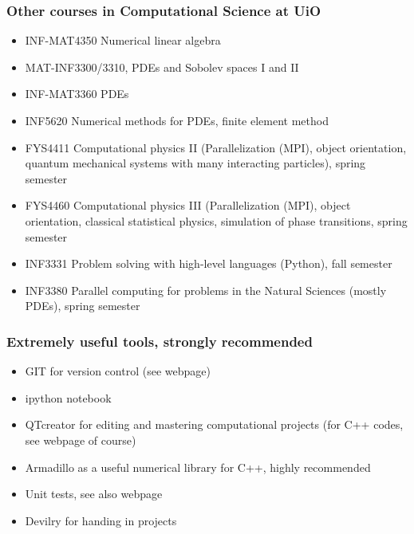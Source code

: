 \documentclass{beamer}
\newenvironment{block_mdfboxadmon}[1][]{\begin{block}{#1}}{\end{block}}
\begin{document}
\begin{frame}
\frametitle{Other courses in Computational Science at UiO}

\begin{block_mdfboxadmon}
\begin{itemize}
  \item INF-MAT4350 Numerical linear algebra

  \item MAT-INF3300/3310, PDEs and Sobolev spaces I and II

  \item INF-MAT3360 PDEs

  \item INF5620 Numerical methods for PDEs, finite element method

  \item FYS4411 Computational physics II (Parallelization (MPI), object orientation, quantum mechanical systems with many interacting particles), spring semester

  \item FYS4460 Computational physics III (Parallelization (MPI), object orientation, classical statistical physics, simulation of phase transitions, spring semester

  \item INF3331 Problem solving with high-level languages (Python), fall semester

  \item INF3380 Parallel computing for problems in the Natural Sciences (mostly PDEs), spring semester
\end{itemize}

\noindent
\end{block_mdfboxadmon}
\end{frame}

\begin{frame}
\frametitle{Extremely useful tools, strongly recommended}

\begin{block_mdfboxadmon}
\begin{itemize}
  \item GIT for version control (see webpage)

  \item ipython notebook

  \item QTcreator for editing and mastering computational projects (for C++ codes, see webpage of course)

  \item Armadillo as a useful numerical library for C++, highly recommended

  \item Unit tests, see also webpage

  \item Devilry for handing in projects
\end{itemize}

\noindent
\end{block_mdfboxadmon}
\end{frame}
\end{document}
